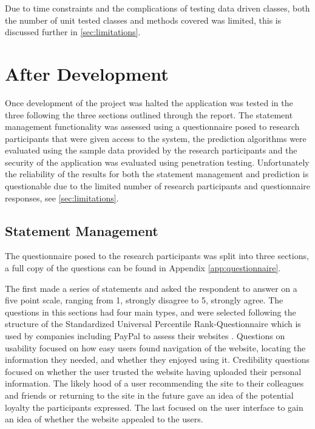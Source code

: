 Due to time constraints and the complications of testing data driven classes, both the number of unit tested classes and methods covered was limited, this is discussed further in \autoref{sec:limitations}.

\section{After Development}
Once development of the project was halted the application was tested in the three following the three sections outlined through the report. The statement management functionality was assessed using a questionnaire posed to research participants that were given access to the system, the prediction algorithms were evaluated using the sample data provided by the research participants and the security of the application was evaluated using penetration testing.
%
Unfortunately the reliability of the results for both the statement management and prediction is questionable due to the limited number of research participants and questionnaire responses, see \autoref{sec:limitations}.


\subsection{Statement Management}
The questionnaire posed to the research participants was split into three sections, a full copy of the questions can be found in Appendix \ref{app:questionnaire}.

The first made a series of statements and asked the respondent to answer on a five point scale, ranging from 1, strongly disagree to 5, strongly agree. The questions in this sections had four main types, and were selected following the structure of the Standardized Universal Percentile Rank-Questionnaire which is used by companies including PayPal to assess their websites \parencite{sauro2011standardized}. 
%
Questions on usability focused on how easy users found navigation of the website, locating the information they needed, and whether they enjoyed using it.
%
Credibility questions focused on whether the user trusted the website having uploaded their personal information.
%
The likely hood of a user recommending the site to their colleagues and friends or returning to the site in the future gave an idea of the potential loyalty the participants expressed.
%
The last focused on the user interface to gain an idea of whether the website appealed to the users.

